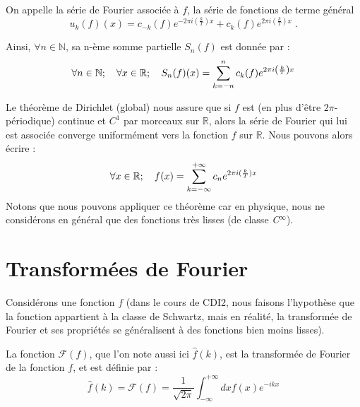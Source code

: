 \documentclass[../notesdecours.tex]{subfiles}
\begin{document}
\begin{definition}
    On appelle la série de Fourier associée à $f$, la série de fonctions de terme général 
    $$u_k(f) (x) = c_{-k}(f) e^{-2\pi i \left(\frac{k}{T}\right) x} + c_{k}(f) e^{2\pi i \left(\frac{k}{T}\right) x}\; .$$
    
Ainsi, $\forall n \in \mathbb{N}$, sa n-ème somme partielle $S_n(f)$ est donnée par :
\begin{equation}
    \forall n\in \mathbb{N} ; \quad \forall x \in \mathbb{R} ;  \quad S_n(f)(x) = \sum_{k=-n}^{n} c_k(f) e^{2\pi i \left( \frac{k}{T} \right) x} \\
\end{equation}
\end{definition}

\begin{theorem}
    Le théorème de Dirichlet (global) nous assure que si $f$ est (en plus d'être $2\pi$-périodique) continue et $C^1$ par morceaux sur $\mathbb{R}$, alors la série de Fourier qui lui est associée converge uniformément 
    vers la fonction $f$ sur $\mathbb{R}$. Nous pouvons alors écrire :  
\begin{equation}
    \forall x \in \mathbb{R} ; \quad f(x) = \sum_{k = -\infty}^{+\infty}c_ne^{2\pi i (\frac{k}{T})x} \\
\end{equation}
Notons que nous pouvons appliquer ce théorème car en physique, nous ne considérons en général que des fonctions très lisses (de classe \textit{C}$^{\infty}$).
\end{theorem}



\section{Transformées de Fourier}

Considérons une fonction $f$ (dans le cours de CDI2, nous faisons l'hypothèse que la fonction 
appartient à la classe de Schwartz, mais en réalité, la transformée de Fourier et ses propriétés se généralisent 
à des fonctions bien moins lisses). \\

\begin{definition}
    La fonction  $\mathcal{F}(f)$, que l'on note aussi ici $\hat{f}(k)$, est la transformée 
    de Fourier de la fonction $f$, et est définie par : 
\begin{equation}
\hat{f}(k) = \mathcal{F}(f) = \frac{1}{\sqrt{2 \pi}} \int_{-\infty}^{+\infty} dx f(x) e^{-ikx}
\end{equation}
\end{definition}
\end{document}
